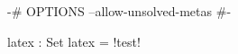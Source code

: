 \documentclass{article}
\begin{document}
\begin{code}
{-# OPTIONS --allow-unsolved-metas #-}

latex : Set
latex = {!test!}
\end{code}
\end{document}
